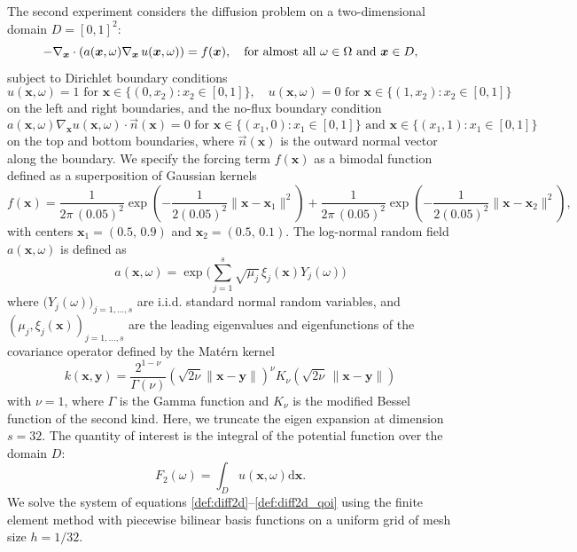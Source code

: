 \documentclass[namedate,webpdf,imanum]{ima-authoring-arxiv}%
\theoremstyle{thmstyletwo}%
\numberwithin{equation}{section}
\newcommand{\bsx}{\boldsymbol{x}}
\newcommand{\bsy}{\boldsymbol{y}}
\begin{document}
The second experiment considers the diffusion problem on a two-dimensional domain $D = [0,1]^2$:
\begin{equation}\label{def:diff2d}
-\nabla_{\bsx} \cdot (a(\bsx, \omega) \nabla_{\bsx} \, u(\bsx, \omega)) = f(\bsx), \quad \mbox{for almost all $ \omega \in \Omega$ and $\bsx \in D$,}
\end{equation}
subject to Dirichlet boundary conditions
\begin{equation}\label{def:diff2d_bc1}
u(\bsx,\omega) = 1 \text{ for } \bsx \in \{(0,x_2): x_2 \in [0,1]\}, \quad u(\bsx,\omega) = 0 \text{ for } \bsx \in \{(1,x_2): x_2 \in [0,1]\}
\end{equation}
on the left and right boundaries, and the no-flux boundary condition
\begin{equation}\label{def:diff2d_bc2}
a(\bsx, \omega) \nabla_{\bsx} u(\bsx,\omega) \cdot \vec{n}(\bsx) = 0 \text{ for } \bsx \in \{(x_1,0): x_1 \in [0,1]\} \text{ and } \bsx \in \{(x_1,1): x_1 \in [0,1]\}
\end{equation}
on the top and bottom boundaries, where $\vec{n}(\bsx)$ is the outward normal vector along the boundary. We specify the forcing term $f(\bsx)$ as a bimodal function defined as a superposition of Gaussian kernels
\begin{equation}\label{def:diff2d_forcing}
f(\bsx) = \frac{1}{2\pi \, (0.05)^2} \exp\!\left( -\frac{1}{2(0.05)^2} \big\| \bsx - \bsx_1\big\|^2 \right) + \frac{1}{2\pi \, (0.05)^2} \exp\!\left( -\frac{1}{2(0.05)^2} \big\| \bsx - \bsx_2\big\|^2 \right),
\end{equation}
with centers $\bsx_1 = (0.5,\,0.9)$ and $ \bsx_2 = (0.5,\,0.1)$. The log-normal random field $a(\bsx, \omega)$ is defined as
\begin{equation}
a(\bsx, \omega) = \exp\Big( \sum_{j = 1}^s \sqrt{\mu_j} \, \xi_j(\bsx) Y_j(\omega) \Big)
\end{equation}
where $\big(Y_j(\omega)\big)_{j = 1, \ldots, s}$ are i.i.d. standard normal random variables, and $(\mu_j, \xi_j(\bsx))_{j=1, \ldots, s}$ are the leading eigenvalues and eigenfunctions of the covariance operator defined by the Mat\'ern kernel 
\[
k(\bsx,\bsy) =\frac{2^{1-\nu}}{\Gamma(\nu)} 
\left( \sqrt{2\nu} \|\bsx - \bsy\| \right)^{\nu}
K_{\nu}\!\left( \sqrt{2\nu}\,\|\bsx - \bsy\| \right)
\]
with $\nu = 1$, where $\Gamma$ is the Gamma function and $K_{\nu}$ is the modified Bessel function of the second kind. Here, we truncate the eigen expansion at dimension $s=32$. The quantity of interest is the integral of the potential function over the domain $D$:
\begin{equation}\label{def:diff2d_qoi}
F_2(\omega) = \int_D u(\bsx,\omega) \mathrm{d} \bsx.
\end{equation}
We solve the system of equations \eqref{def:diff2d}--\eqref{def:diff2d_qoi} using the finite element method with piecewise bilinear basis functions on a uniform grid of mesh size $h = 1/32$.
\end{document}
